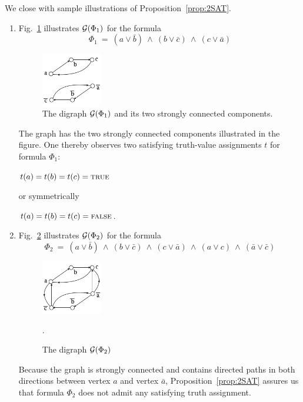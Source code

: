 \medskip

\noindent We close with sample illustrations of Proposition~\ref{prop:2SAT}.
\begin{enumerate}
\item
Fig.~\ref{2SATyes} illustrates $\mbox{$\cal G$}(\Phi_1)$ for the formula
\[ \Phi_1 \ = \ (a \vee \bar{b}) \ \wedge \ (b \vee \bar{c}) \ \wedge \ (c \vee \bar{a}) \]
\begin{figure}[htb]
\begin{center}
\includegraphics[width=0.25\textwidth]{FiguresGraph/2SATyes.png}
\caption{The digraph $\mbox{$\cal G$}(\Phi_1)$ and its two strongly connected components.}
\label{2SATyes}
\end{center}
\end{figure}
The graph has the two strongly connected components illustrated in the figure.  One thereby observes two satisfying truth-value assignments $t$ for formula $\Phi_1$:

\smallskip

\hspace*{.2in} $t(a) = t(b) = t(c) = \mbox{\sc true}$

\smallskip

or symmetrically

\smallskip

\hspace*{.2in} $t(a) = t(b) = t(c) = \mbox{\sc false}$.

\medskip\item
Fig.~\ref{2SATno} illustrates $\mbox{$\cal G$}(\Phi_2)$ for the formula
\[ \Phi_2 \ = \ (a \vee \bar{b}) \ \wedge \ (b \vee \bar{c}) \ \wedge \ (c \vee \bar{a})
 \ \wedge \ (a \vee c) \ \wedge \ (\bar{a} \vee \bar{c})
\]
\begin{figure}[htb]
\begin{center}
\includegraphics[width=0.25\textwidth]{FiguresGraph/2SATno.png}
\caption{The digraph $\mbox{$\cal G$}(\Phi_2)$}. 
\label{2SATno}
\end{center}
\end{figure}

Because the graph is strongly connected and contains directed paths in both directions between vertex $a$ and vertex $\bar{a}$, Proposition~\ref{prop:2SAT} assures us that formula $\Phi_2$ does not admit any satisfying truth assignment.
\end{enumerate}

